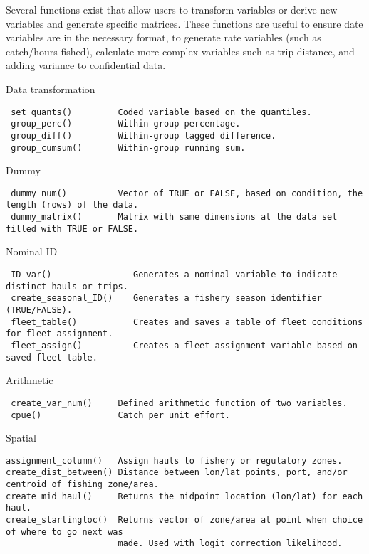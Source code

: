 \documentclass[
]{article}
\begin{document}
Several functions exist that allow users to transform variables or derive new variables and generate specific matrices. These functions are useful to ensure date variables are in the necessary format, to generate rate variables (such as catch/hours fished), calculate more complex variables such as trip distance, and adding variance to confidential data.

Data transformation

\begin{verbatim}
 set_quants()         Coded variable based on the quantiles.
 group_perc()         Within-group percentage.
 group_diff()         Within-group lagged difference.   
 group_cumsum()       Within-group running sum.
\end{verbatim}

Dummy

\begin{verbatim}
 dummy_num()          Vector of TRUE or FALSE, based on condition, the length (rows) of the data. 
 dummy_matrix()       Matrix with same dimensions at the data set filled with TRUE or FALSE.
\end{verbatim}

Nominal ID

\begin{verbatim}
 ID_var()                Generates a nominal variable to indicate distinct hauls or trips.
 create_seasonal_ID()    Generates a fishery season identifier (TRUE/FALSE).
 fleet_table()           Creates and saves a table of fleet conditions for fleet assignment.
 fleet_assign()          Creates a fleet assignment variable based on saved fleet table.
\end{verbatim}

Arithmetic

\begin{verbatim}
 create_var_num()     Defined arithmetic function of two variables.
 cpue()               Catch per unit effort.
\end{verbatim}

Spatial

\begin{verbatim}
assignment_column()   Assign hauls to fishery or regulatory zones.
create_dist_between() Distance between lon/lat points, port, and/or centroid of fishing zone/area.
create_mid_haul()     Returns the midpoint location (lon/lat) for each haul.
create_startingloc()  Returns vector of zone/area at point when choice of where to go next was  
                      made. Used with logit_correction likelihood.
\end{verbatim}
\end{document}

